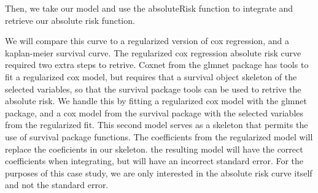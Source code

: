 \documentclass[
]{jss}
\begin{document}
Then, we take our model and use the absoluteRisk function to integrate
and retrieve our absolute risk function.

\begin{CodeChunk}

\end{CodeChunk}

We will compare this curve to a regularized version of cox regression,
and a kaplan-meier survival curve. The regularized cox regression
absolute risk curve required two extra steps to retrive. Coxnet from the
glmnet package has tools to fit a regularized cox model, but requires
that a survival object skeleton of the selected variables, so that the
survival package tools can be used to retrive the absolute risk. We
handle this by fitting a regularized cox model with the glmnet package,
and a cox model from the survival package with the selected variables
from the regularized fit. This second model serves as a skeleton that
permits the use of survival package functions. The coefficients from the
regularized model will replace the coeficients in our skeleton. the
resulting model will have the correct coefficients when integrating, but
will have an incorrect standard error. For the purposes of this case
study, we are only interested in the absolute risk curve itself and not
the standard error.
\end{document}
